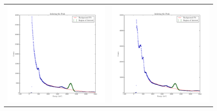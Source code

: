 \documentclass{article}
\begin{document}
  \begin{figure}[!htb]
    \centering
    \begin{tabular}{c c}
      \includegraphics[scale=.4]{../plots/peak_isolation_nolead_portclosed.pdf} & \includegraphics[scale=.4]{../plots/peak_isolation_nolead_portopen.pdf} \\

\end{tabular}
\end{figure}
\end{document}
